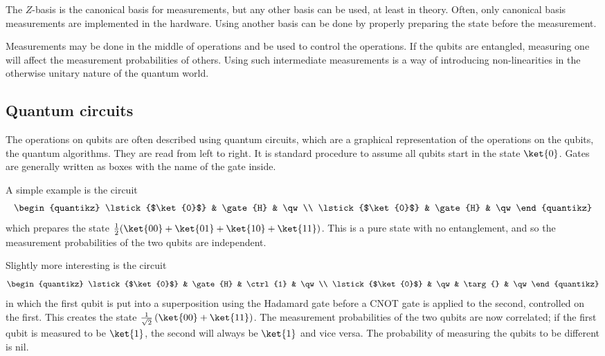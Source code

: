 The $Z$-basis is the canonical basis for measurements, but any other basis can be used, at least in theory.
Often, only canonical basis measurements are implemented in the hardware.
Using another basis can be done by properly preparing the state before the measurement.

Measurements may be done in the middle of operations and be used to control the operations.
If the qubits are entangled, measuring one will affect the measurement probabilities of others.
Using such intermediate measurements is a way of introducing non-linearities in the otherwise unitary nature of the quantum world.


\subsection{Quantum circuits}
The operations on qubits are often described using quantum circuits, which are a graphical representation of the operations on the qubits, the quantum algorithms.
They are read from left to right.
It is standard procedure to assume all qubits start in the state $\ket{0}$.
Gates are generally written as boxes with the name of the gate inside.

A simple example is the circuit
\begin{equation}
    \begin{quantikz}
        \lstick{$\ket{0}$} & \gate{H} & \qw \\
        \lstick{$\ket{0}$} & \gate{H} & \qw
    \end{quantikz}
\end{equation}
which prepares the state $\frac{1}{2}(\ket{00} + \ket{01} + \ket{10} + \ket{11})$.
This is a pure state with no entanglement, and so the measurement probabilities of the two qubits are independent.

Slightly more interesting is the circuit
\begin{equation}
    \begin{quantikz}
        \lstick{$\ket{0}$} & \gate{H} & \ctrl{1} & \qw \\
        \lstick{$\ket{0}$} & \qw & \targ{} & \qw
    \end{quantikz}
\end{equation}
in which the first qubit is put into a superposition using the Hadamard gate before a CNOT gate is applied to the second, controlled on the first.
This creates the state $\frac{1}{\sqrt{2}}\left(\ket{00} + \ket{11}\right)$.
The measurement probabilities of the two qubits are now correlated; if the first qubit is measured to be $\ket{1}$, the second will always be $\ket{1}$ and vice versa.
The probability of measuring the qubits to be different is nil.

